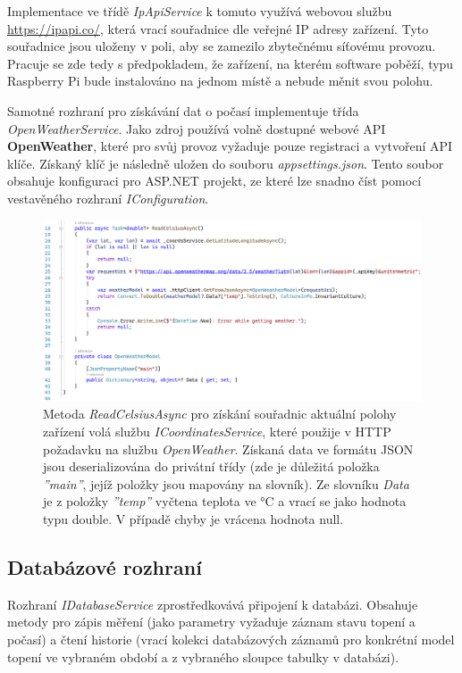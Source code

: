 Implementace ve třídě {\it IpApiService} k tomuto využívá webovou službu \url{https://ipapi.co/}, která vrací souřadnice dle veřejné IP adresy zařízení. Tyto souřadnice jsou uloženy v poli, aby se zamezilo zbytečnému síťovému provozu. Pracuje se zde tedy s předpokladem, že zařízení, na kterém software poběží, typu Raspberry Pi bude instalováno na jednom místě a nebude měnit svou polohu.

Samotné rozhraní pro získávání dat o počasí implementuje třída {\it OpenWeatherService}. Jako zdroj používá volně dostupné webové API \textbf{OpenWeather}, které pro svůj provoz vyžaduje pouze registraci a vytvoření API klíče. Získaný klíč je následně uložen do souboru {\it appsettings.json}. Tento soubor obsahuje konfiguraci pro ASP.NET projekt, ze které lze snadno číst pomocí vestavěného rozhraní {\it IConfiguration}.

\begin{figure}[hbt]
\includegraphics[width=1.05\textwidth]{obrazky-figures/code-openweather-read.png}
\caption{Metoda {\it ReadCelsiusAsync} pro získání souřadnic aktuální polohy zařízení volá službu {\it ICoordinatesService}, které použije v HTTP požadavku na službu {\it OpenWeather}. Získaná data ve formátu JSON jsou deserializována do privátní třídy (zde je důležitá položka {\it ''main''}, jejíž položky jsou mapovány na slovník). Ze slovníku {\it Data} je z položky {\it ''temp''} vyčtena teplota ve °C a vrací se jako hodnota typu double. V případě chyby je vrácena hodnota null.}
\end{figure}

\pagebreak

\subsection{Databázové rozhraní}
Rozhraní {\it IDatabaseService} zprostředkovává připojení k databázi. Obsahuje metody pro zápis měření (jako parametry vyžaduje záznam stavu topení a počasí) a čtení historie (vrací kolekci databázových záznamů pro konkrétní model topení ve vybraném období a z vybraného sloupce tabulky v databázi).

